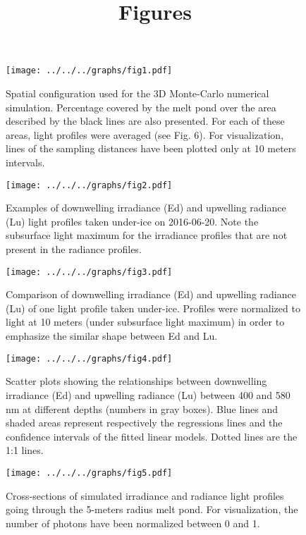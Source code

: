 \documentclass[12pt,a4paper]{scrartcl}
\title{Figures}
\date{}
\begin{document}
\maketitle

\begin{figure}[ht]
	\centering
	\texttt{[image: ../../../graphs/fig1.pdf]}
	\caption{Spatial configuration used for the 3D Monte-Carlo numerical simulation. Percentage covered by the melt pond over the area described by the black lines are also presented. For each of these areas, light profiles were averaged (see Fig. 6). For visualization, lines of the sampling distances have been plotted only at 10 meters intervals.}
\end{figure}

\clearpage
\newpage

\begin{figure}[ht]
	\centering
	\texttt{[image: ../../../graphs/fig2.pdf]}
	\caption{Examples of downwelling irradiance (Ed) and upwelling radiance (Lu) light profiles taken under-ice on 2016-06-20. Note the subsurface light maximum for the irradiance profiles that are not present in the radiance profiles.}
\end{figure}

\clearpage
\newpage

\begin{figure}[ht]
	\centering
	\texttt{[image: ../../../graphs/fig3.pdf]}
	\caption{Comparison of downwelling irradiance (Ed) and upwelling radiance (Lu) of one light profile taken under-ice. Profiles were normalized to light at 10 meters (under subsurface light maximum) in order to emphasize the similar shape between Ed and Lu.}
\end{figure}

\clearpage
\newpage

\begin{figure}[ht]
	\centering
	\texttt{[image: ../../../graphs/fig4.pdf]}
	\caption{Scatter plots showing the relationships between downwelling irradiance (Ed) and upwelling radiance (Lu) between 400 and 580 nm at different depths (numbers in gray boxes). Blue lines and shaded areas represent respectively the regressions lines and the confidence intervals of the fitted linear models. Dotted lines are the 1:1 lines.}
\end{figure}

\clearpage
\newpage

\begin{figure}[ht]
	\centering
	\texttt{[image: ../../../graphs/fig5.pdf]}
	\caption{Cross-sections of simulated irradiance and radiance light profiles going through the 5-meters radius melt pond. For visualization, the number of photons have been normalized between 0 and 1.}
\end{figure}
\end{document}
